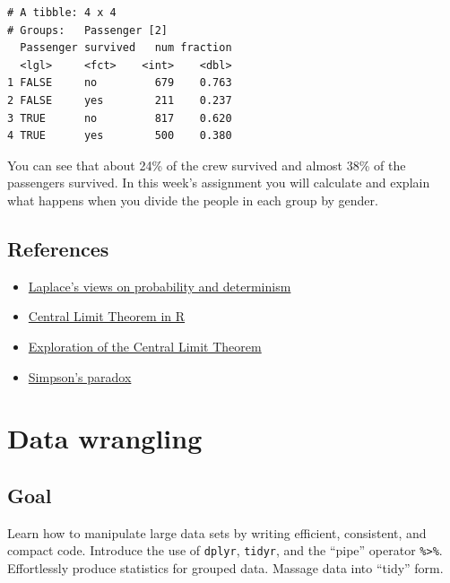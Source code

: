 \documentclass[
  letterpaper,
  DIV=11,
  numbers=noendperiod]{scrreprt}
\providecommand{\tightlist}{%
  \setlength{\itemsep}{0pt}\setlength{\parskip}{0pt}}\usepackage{longtable,booktabs,array}
\begin{document}
\begin{verbatim}
# A tibble: 4 x 4
# Groups:   Passenger [2]
  Passenger survived   num fraction
  <lgl>     <fct>    <int>    <dbl>
1 FALSE     no         679    0.763
2 FALSE     yes        211    0.237
3 TRUE      no         817    0.620
4 TRUE      yes        500    0.380
\end{verbatim}

You can see that about 24\% of the crew survived and almost 38\% of the
passengers survived. In this week's assignment you will calculate and
explain what happens when you divide the people in each group by gender.

\hypertarget{references}{%
\section{References}\label{references}}

\begin{itemize}
\tightlist
\item
  \href{https://www.bayesianspectacles.org/laplaces-demon/}{Laplace's
  views on probability and determinism}
\item
  \href{https://medium.com/@ODSC/exploring-the-central-limit-theorem-in-r-e2a2f7091606}{Central
  Limit Theorem in R}
\item
  \href{https://genomicsclass.github.io/book/pages/clt_in_practice.html}{Exploration
  of the Central Limit Theorem}
\item
  \href{https://medium.com/@nikhilborkar/the-simpsons-paradox-and-where-to-find-them-cfcec6c2d8b3}{Simpson's
  paradox}
\end{itemize}


\hypertarget{data-wrangling}{%
\chapter{Data wrangling}\label{data-wrangling}}

\hypertarget{goal-2}{%
\section{Goal}\label{goal-2}}

Learn how to manipulate large data sets by writing efficient,
consistent, and compact code. Introduce the use of \texttt{dplyr},
\texttt{tidyr}, and the ``pipe'' operator \texttt{\%\textgreater{}\%}.
Effortlessly produce statistics for grouped data. Massage data into
``tidy'' form.
\end{document}
